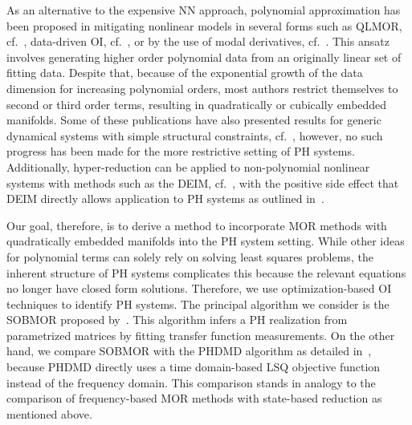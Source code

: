 As an alternative to the expensive \ac{NN} approach, polynomial approximation has been proposed in mitigating nonlinear models in several forms such as QLMOR, cf.~\cite{Gu2011}, data-driven \ac{OI}, cf.~\cite{Peherstorfer2016, Kramer2019, BGK2020, Qian2022, Geelen2023, Sharma2023}, or by the use of modal derivatives, cf.~\cite{Jain2017, Rutzmoser2017}.
This ansatz involves generating higher order polynomial data from an originally linear set of fitting data.
Despite that, because of the exponential growth of the data dimension for increasing polynomial orders, most authors restrict themselves to second or third order terms, resulting in quadratically or cubically embedded manifolds.
Some of these publications have also presented results for generic dynamical systems with simple structural constraints, cf.~\cite{BGH2020, Qian2020, Gosea2021, Khodabakhshi2022}, however, no such progress has been made for the more restrictive setting of \ac{PH} systems.
Additionally, hyper-reduction can be applied to non-polynomial nonlinear systems with methods such as the \ac{DEIM}, cf.~\cite{Chaturantabut2010}, with the positive side effect that \ac{DEIM} directly allows application to \ac{PH} systems as outlined in~\cite{Chaturantabut2016}.

Our goal, therefore, is to derive a method to incorporate \ac{MOR} methods with quadratically embedded manifolds into the \ac{PH} system setting.
While other ideas for polynomial terms can solely rely on solving least squares problems, the inherent structure of \ac{PH} systems complicates this because the relevant equations no longer have closed form solutions.
Therefore, we use optimization-based \ac{OI} techniques to identify \ac{PH} systems.
The principal algorithm we consider is the \ac{SOBMOR} proposed by~\cite{SV2023}.
This algorithm infers a \ac{PH} realization from parametrized matrices by fitting transfer function measurements.
On the other hand, we compare \ac{SOBMOR} with the \ac{PHDMD} algorithm as detailed in~\cite{Morandin2023}, because \ac{PHDMD} directly uses a time domain-based \ac{LSQ} objective function instead of the frequency domain.
This comparison stands in analogy to the comparison of frequency-based \ac{MOR} methods with state-based reduction as mentioned above.

